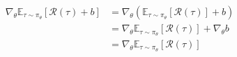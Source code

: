 
\begin{align*}
    \nabla_\theta \mathds{E}_{\tau \sim \pi_\theta} [\mathcal{R}(\tau) + b]
    &= \nabla_\theta \left( \mathds{E}_{\tau \sim \pi_\theta} [\mathcal{R}(\tau)] + b \right) \\
    &= \nabla_\theta \mathds{E}_{\tau \sim \pi_\theta} [\mathcal{R}(\tau)] + \nabla_\theta b \\
    &= \nabla_\theta \mathds{E}_{\tau \sim \pi_\theta} [\mathcal{R}(\tau)]
\end{align*}

